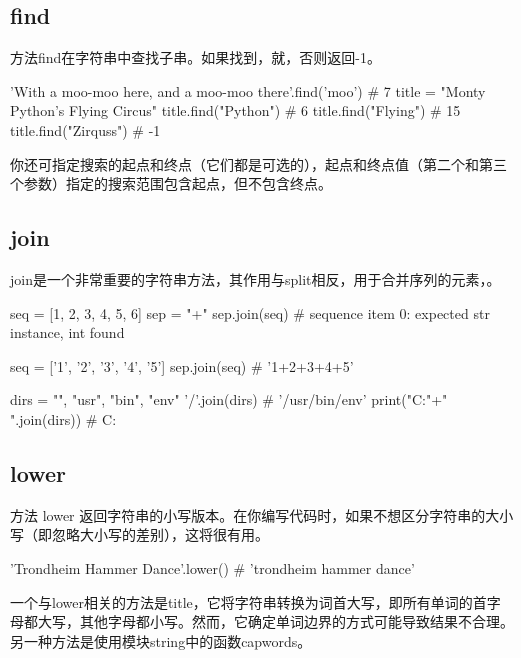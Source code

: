 \subsection{find}
方法find在字符串中查找子串。如果找到，就，否则返回-1。
\begin{pyc}
'With a moo-moo here, and a moo-moo there'.find('moo')  # 7
title = "Monty Python's Flying Circus"
title.find("Python")  # 6
title.find("Flying")  # 15
title.find("Zirquss")  # -1
\end{pyc}


你还可指定搜索的起点和终点（它们都是可选的），起点和终点值（第二个和第三个参数）指定的搜索范围包含起点，但不包含终点。


\subsection{join}
join是一个非常重要的字符串方法，其作用与split相反，用于合并序列的元素，。
\begin{pyc}
seq = [1, 2, 3, 4, 5, 6]
sep = "+"
sep.join(seq)
# sequence item 0: expected str instance, int found

seq = ['1', '2', '3', '4', '5']
sep.join(seq)  # '1+2+3+4+5'

dirs = "", "usr", "bin", "env"
'/'.join(dirs)  # '/usr/bin/env'
print("C:"+"\\".join(dirs))  # C:\usr\bin\env
\end{pyc}

\subsection{lower}
方法 lower 返回字符串的小写版本。在你编写代码时，如果不想区分字符串的大小写（即忽略大小写的差别），这将很有用。
\begin{pyc}
'Trondheim Hammer Dance'.lower()  # 'trondheim hammer dance'
\end{pyc}

一个与lower相关的方法是title，它将字符串转换为词首大写，即所有单词的首字母都大写，其他字母都小写。然而，它确定单词边界的方式可能导致结果不合理。另一种方法是使用模块string中的函数capwords。

